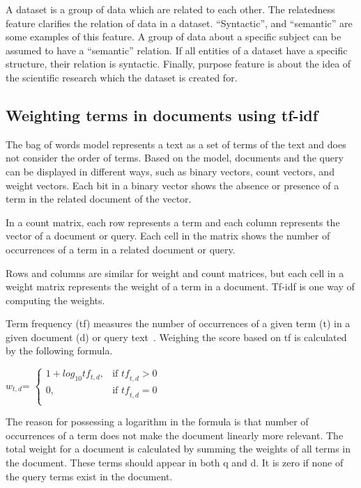 \documentclass{IOS-Book-Article}
\begin{document}
A dataset is a group of data which are related to each other. The relatedness feature clarifies the relation of data in a dataset. \enquote{Syntactic}, and \enquote{semantic} are some examples of this feature.   
A group of data about a specific subject can be assumed to have a \enquote{semantic} relation.
If all entities of a dataset have a specific structure, their relation is syntactic.
Finally, purpose feature is about the idea of the scientific research which the dataset is created for.
\subsection{Weighting terms in documents using tf-idf}
\label{sec:tfidf}
The bag of words model represents a text as a set of terms of the text and does not consider the order of terms. Based on the model, documents and the query can be displayed in different ways, such as binary vectors, count vectors, and weight vectors. Each bit in a binary vector shows the absence or presence of a term in the related document of the vector.

In a count matrix, each row represents a term and each column represents the vector of a document or query. Each cell in the matrix shows the number of occurrences of a term in a related document or query. 

Rows and columns are similar for weight and count matrices, but each cell in a weight matrix represents the weight of a term in a document. Tf-idf is one way of computing the weights.

Term frequency (tf) measures the number of occurrences of a given term (t) in a given document (d) or query text~\citep{SALTON1988}. Weighing the score based on tf is calculated by the following formula. 
\begin{center} 
	$w_{t,d}$=
	$\begin{cases}
	1+log_{10} tf_{t,d}, & \text{if $\mathit{tf}_{t,d}>0$} \\
	0, & \text{if $\mathit{tf}_{t,d}=0$}\\
	\end{cases}$
\end{center}

The reason for possessing a logarithm in the formula is that number of occurrences of a term does not make the document linearly more relevant. The total weight for a document is calculated by summing the weights of all terms in the document. These terms should appear in both q and d. It is zero if none of the query terms exist in the document.
\end{document}
